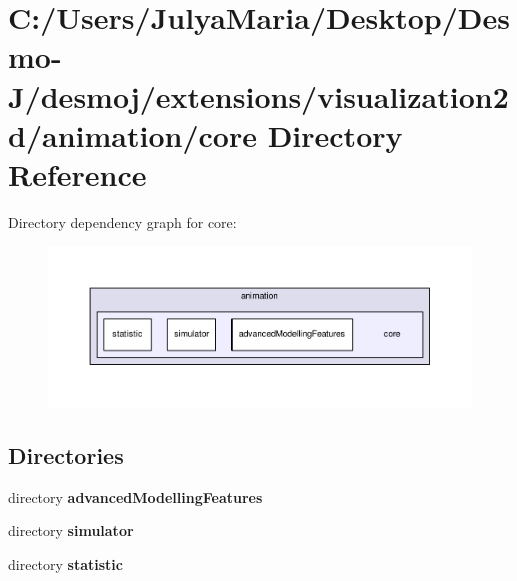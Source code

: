 \section{C\-:/\-Users/\-Julya\-Maria/\-Desktop/\-Desmo-\/\-J/desmoj/extensions/visualization2d/animation/core Directory Reference}
\label{dir_5167af2fbcb634092a23451136d3779a}
Directory dependency graph for core\-:
\nopagebreak
\begin{figure}[H]
\begin{center}
\leavevmode
\includegraphics[width=350pt]{dir_5167af2fbcb634092a23451136d3779a_dep}
\end{center}
\end{figure}
\subsection*{Directories}
\begin{DoxyCompactItemize}
\item 
directory {\bf advanced\-Modelling\-Features}
\item 
directory {\bf simulator}
\item 
directory {\bf statistic}
\end{DoxyCompactItemize}
